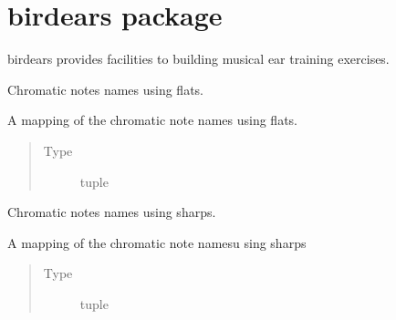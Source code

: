 \documentclass[letterpaper,10pt,english]{sphinxmanual}
\begin{document}
\chapter{birdears package}
\label{\detokenize{index:module-birdears}}\label{\detokenize{index:birdears-package}}
birdears provides facilities to building musical ear training exercises.

\begin{fulllineitems}
\label{\detokenize{index:birdears.CHROMATIC_FLAT}}
Chromatic notes names using flats.

A mapping of the chromatic note names using flats.
\begin{quote}\begin{description}
\item[{Type}] \leavevmode
tuple

\end{description}\end{quote}

\end{fulllineitems}


\begin{fulllineitems}
\label{\detokenize{index:birdears.CHROMATIC_SHARP}}
Chromatic notes names using sharps.

A mapping of the chromatic note namesu sing sharps
\begin{quote}\begin{description}
\item[{Type}] \leavevmode
tuple

\end{description}\end{quote}

\end{fulllineitems}

\end{document}

